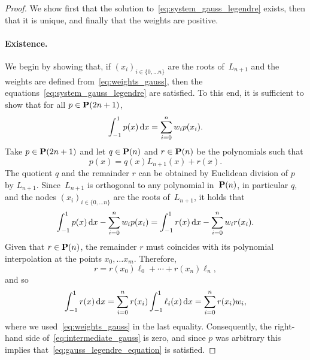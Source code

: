 \begin{proof}
    We show first that the solution to~\eqref{eq:system_gauss_legendre} exists,
    then that it is unique,
    and finally that the weights are positive.
    \paragraph{Existence.}
    We begin by showing that,
    if $(x_i)_{i \in \{0,\dotsc n\}}$ are the roots of~$L_{n+1}$ and the weights are defined from~\eqref{eq:weights_gauss},
    then the equations~\eqref{eq:system_gauss_legendre} are satisfied.
    To this end,
    it is sufficient to show that for all $p \in \mathbf P(2n + 1)$,
    \begin{equation}
        \label{eq:gauss_legendre_equation}
        \int_{-1}^{1} p(x) \, \mathrm d x = \sum_{i=0}^{n} w_i p(x_i).
    \end{equation}
    Take $p \in \mathbf P(2n + 1)$ and let $q \in \mathbf P(n)$ and $r \in \mathbf P(n)$ be the polynomials such that
    \[
        p(x) = q(x) L_{n+1}(x) + r(x).
    \]
    The quotient $q$ and the remainder $r$ can be obtained by Euclidean division of $p$ by $L_{n+1}$.
    Since~$L_{n+1}$ is orthogonal to any polynomial in~$\mathbf P(n)$,
    in particular $q$,
    and the nodes $(x_i)_{i \in \{0,\dotsc n\}}$ are the roots of~$L_{n+1}$,
    it holds that
    \begin{equation}
        \label{eq:intermediate_gauss}
        \int_{-1}^{1} p(x) \, \mathrm d x
        - \sum_{i=0}^{n} w_i p(x_i)
        = \int_{-1}^{1} r(x) \, \mathrm d x
        - \sum_{i=0}^{n} w_i r(x_i).
    \end{equation}
    Given that $r \in \mathbf P(n)$,
    the remainder $r$ must coincides with its polynomial interpolation at the points $x_0, \dotsc x_m$.
    Therefore,
    \[
        r = r(x_0) \ell_0 + \dotsb + r(x_n) \ell_n,
    \]
    and so
    \[
        \int_{-1}^1 r(x) \, \mathrm d x
        = \sum_{i=0}^{n} r(x_i) \int_{-1}^1 \ell_i(x) \, \mathrm d x
        = \sum_{i=0}^{n} r(x_i) w_i,
    \]
    where we used~\eqref{eq:weights_gauss} in the last equality.
    Consequently, the right-hand side of~\eqref{eq:intermediate_gauss} is zero,
    and since $p$ was arbitrary this implies that~\eqref{eq:gauss_legendre_equation} is satisfied.


\end{proof}
